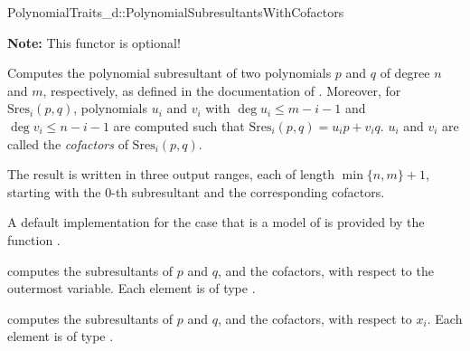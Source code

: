 \begin{ccRefConcept}{PolynomialTraits_d::PolynomialSubresultantsWithCofactors}

\textbf{Note:} This functor is optional!

\ccDefinition

Computes the polynomial subresultant of two polynomials $p$ and $q$ of degree
$n$ and $m$, respectively, 
as defined in the documentation of .
Moreover, for $\mathrm{Sres}_i(p,q)$, polynomials $u_i$ and $v_i$
with $\deg u_i\leq m-i-1$ and $\deg v_i\leq n-i-1$ are computed 
such that $\mathrm{Sres}_i(p,q)=u_i p + v_i q$. $u_i$ and $v_i$ are called
the \emph{cofactors} of $\mathrm{Sres}_i(p,q)$.
 
The result is written in three output ranges, each of length $\min\{n,m\}+1$, 
starting with the $0$-th subresultant and the corresponding cofactors.

A default implementation for the case that 
is a model of 
is provided by the function .

\ccOperations
{}
         { computes the subresultants of $p$ and $q$, and the cofactors, 
           with respect to the outermost variable. Each element is of type
           .}

         { computes the subresultants of $p$ and $q$, and the cofactors, 
           with respect to $x_i$. Each element is of type
           .}


\ccSeeAlso

\\
\\
\\
\\

\end{ccRefConcept}
